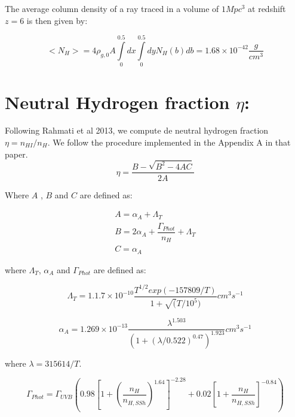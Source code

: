 \documentclass[12pt]{article}
\begin{document}
The average column density of a ray traced in a volume of $1Mpc^3$ at redshift $z=6$ is then given by:

\begin{equation}
<N_H> = 4 \rho_{g,0}A\int \limits_0^{0.5} dx \int \limits_{0}^{0.5}dy N_H(b) db = 1.68\times 10^{-42} \dfrac{g}{cm^3}
\end{equation}


\section{Neutral Hydrogen fraction $\eta$:}\label{sec:eta}

Following Rahmati et al 2013, we compute de neutral hydrogen fraction $\eta = n_{HI} / n_H$. We follow
the procedure implemented in the Appendix A in that paper.\\

\begin{equation}\label{eq:eta}
\eta = \dfrac{B - \sqrt{B^2 - 4AC}}{2A}
\end{equation}

Where $A$ , $B$ and $C$ are defined as: 

\begin{equation}
\begin{split}
A = \alpha_A + \Lambda_T \\
B = 2\alpha_A + \dfrac{\Gamma_{Phot}}{n_H} + \Lambda_T \\
C = \alpha_A
\end{split}
\end{equation}

where $\Lambda_T$, $\alpha_A$ and $\Gamma_{Phot}$ are defined as:

\begin{equation}
\Lambda_T = 1.1.7 \times 10 ^{-10} \dfrac{T^{1/2} exp(-157809/T)}{1 + \sqrt(T/10^5)} cm^3 s^{-1}
\end{equation}


\begin{equation}
\alpha_A = 1.269 \times 10 ^{-13} \dfrac{\lambda^{1.503}}{(1 + (\lambda / 0.522)^{0.47} )^{1.923}} cm^{3} s^{-1}
\end{equation}

where $\lambda = 315614 / T$. 

\begin{equation}
\Gamma_{Phot} = \Gamma_{UVB} \left(  0.98\left[ 1 + \left( \dfrac{n_H}{n_{H, SSh}} \right)^{1.64}  \right]^{-2.28} + 0.02 \left[ 1 + \dfrac{n_H}{n_{H,SSh}} \right]^{-0.84}   \right) 
\end{equation}
\end{document}
